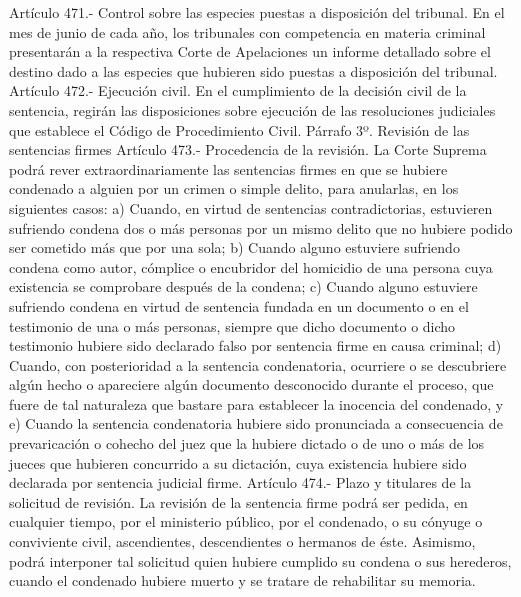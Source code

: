    Artículo 471.- Control sobre las especies puestas a disposición del tribunal. En el mes de junio de cada año, los tribunales con competencia en materia criminal presentarán a la respectiva Corte de Apelaciones un informe detallado sobre el destino dado a las especies que hubieren sido puestas a disposición del tribunal.
    Artículo 472.- Ejecución civil. En el cumplimiento de la decisión civil de la sentencia, regirán las disposiciones sobre ejecución de las resoluciones judiciales que establece el Código de Procedimiento Civil.
    Párrafo 3º. Revisión de las sentencias firmes
    Artículo 473.- Procedencia de la revisión. La Corte Suprema podrá rever extraordinariamente las sentencias firmes en que se hubiere condenado a alguien por un crimen o simple delito, para anularlas, en los siguientes casos:
    a) Cuando, en virtud de sentencias contradictorias, estuvieren sufriendo condena dos o más personas por un mismo delito que no hubiere podido ser cometido más que por una sola;
    b) Cuando alguno estuviere sufriendo condena como autor, cómplice o encubridor del homicidio de una persona cuya existencia se comprobare después de la condena;
    c) Cuando alguno estuviere sufriendo condena en virtud de sentencia fundada en un documento o en el testimonio de una o más personas, siempre que dicho documento o dicho testimonio hubiere sido declarado falso por sentencia firme en causa criminal;
    d) Cuando, con posterioridad a la sentencia condenatoria, ocurriere o se descubriere algún hecho o apareciere algún documento desconocido durante el proceso, que fuere de tal naturaleza que bastare para establecer la inocencia del condenado, y
    e) Cuando la sentencia condenatoria hubiere sido pronunciada a consecuencia de prevaricación o cohecho del juez que la hubiere dictado o de uno o más de los jueces que hubieren concurrido a su dictación, cuya existencia hubiere sido declarada por sentencia judicial firme.
    Artículo 474.- Plazo y titulares de la solicitud de revisión. La revisión de la sentencia firme podrá ser pedida, en cualquier tiempo, por el ministerio público, por el condenado, o su cónyuge o conviviente civil, ascendientes, descendientes o hermanos de éste. Asimismo, podrá interponer tal solicitud quien hubiere cumplido su condena o sus herederos, cuando el condenado hubiere muerto y se tratare de rehabilitar su memoria.

